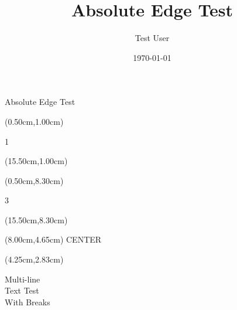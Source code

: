 \documentclass[aspectratio=169,xcolor=dvipsnames,professionalfonts]{beamer}
\title{Absolute Edge Test}
\author{Test User}
\date{\today}
\begin{document}
\begin{frame}
\titlepage
\end{frame}

\begin{frame}{Absolute Edge Test}

\begin{textblock*}{1.00cm}(0.50cm,1.00cm)
{\fontsize{12}{14.399999999999999}\selectfont\raggedright 1}
\end{textblock*}

\begin{textblock*}{1.00cm}(15.50cm,1.00cm)
{\fontsize{12}{14.399999999999999}\selectfont{}}
\end{textblock*}

\begin{textblock*}{1.00cm}(0.50cm,8.30cm)
{\fontsize{12}{14.399999999999999}\selectfont\raggedright 3}
\end{textblock*}

\begin{textblock*}{1.00cm}(15.50cm,8.30cm)
{\fontsize{12}{14.399999999999999}\selectfont{}}
\end{textblock*}

\begin{textblock*}{1.00cm}(8.00cm,4.65cm)
{\fontsize{14}{16.8}\selectfont\centering CENTER}
\end{textblock*}

\begin{textblock*}{3.75cm}(4.25cm,2.83cm)
{\fontsize{16}{19.2}\selectfont\raggedright Multi-line\\Text Test\\With Breaks}
\end{textblock*}
\end{frame}
\end{document}
